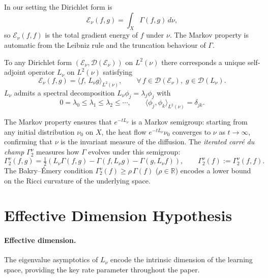 \documentclass{article}
\begin{document}
In our setting the Dirichlet form is
\[
	\mathcal{E}_\nu(f,g) = \int_X \Gamma(f,g)\,d\nu,
\]
so $\mathcal{E}_\nu(f,f)$ is the total gradient energy of $f$ under $\nu$.
The Markov property is automatic from the Leibniz rule and the truncation
behaviour of $\Gamma$.

\begin{definition}
	To any Dirichlet form $(\mathcal{E}_\nu, \mathcal{D}(\mathcal{E}_\nu))$ on
	$L^2(\nu)$ there corresponds a unique self-adjoint operator $L_\nu$ on
	$L^2(\nu)$ satisfying
	\[
		\mathcal{E}_\nu(f,g) = \langle f,\, L_\nu g\rangle_{L^2(\nu)},
		\qquad \forall\,f\in\mathcal{D}(\mathcal{E}_\nu),\;
		g\in\mathcal{D}(L_\nu).
	\]
	$L_\nu$ admits a spectral decomposition $L_\nu\phi_j = \lambda_j\phi_j$ with
	\[
		0 = \lambda_0 \le \lambda_1 \le \lambda_2 \le \cdots,
		\qquad
		\langle\phi_j,\phi_k\rangle_{L^2(\nu)} = \delta_{jk}.
	\]
\end{definition}

The Markov property ensures that $e^{-tL_\nu}$ is a Markov semigroup:
starting from any initial distribution $\nu_0$ on $X$, the heat flow
$e^{-tL_\nu}\nu_0$ converges to $\nu$ as $t\to\infty$, confirming that
$\nu$ is the invariant measure of the diffusion.
The \emph{iterated carré du champ} $\Gamma_2^{\nu}$ measures how $\Gamma$
evolves under this semigroup:
\[
	\Gamma_2^\nu(f,g)
	= \tfrac{1}{2}\!\left(L_\nu\Gamma(f,g) - \Gamma(f,L_\nu g)
	- \Gamma(g,L_\nu f)\right),
	\qquad
	\Gamma_2^\nu(f) := \Gamma_2^\nu(f,f).
\]
The Bakry--Émery condition $\Gamma_2^\nu(f)\ge\rho\,\Gamma(f)$ ($\rho\in\mathbb{R}$)
encodes a lower bound on the Ricci curvature of the underlying space.

\section{Effective Dimension Hypothesis}


\paragraph{Effective dimension.}
The eigenvalue asymptotics of $L_\nu$ encode the intrinsic dimension of the
learning space, providing the key rate parameter throughout the paper.
\end{document}
